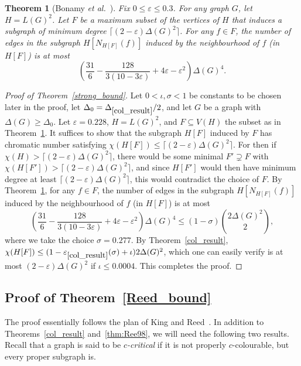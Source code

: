 \documentclass[11pt]{article}
\theoremstyle{plain}
\newtheorem{theorem}{Theorem}[section]
\newcommand{\eps}{\varepsilon}
\begin{document}
\begin{theorem}[Bonamy {\em et al.}~\cite{BPP18+}]\label{thm:BPP18+}
Fix $0\le \eps\le 0.3$. For any graph $G$, let $H=L(G)^2$.
Let $F$ be a maximum subset of the vertices of $H$ that induces a subgraph of minimum degree $\lceil(2-\eps)\Delta(G)^2\rceil$. For any $f\in F$, the number of edges in the subgraph $H[N_{H[F]}(f)]$ induced by the neighbourhood of $f$ (in $H[F]$) is at most
\[
\left(\frac{31}{6}-\frac{128}{3(10-3\eps)}+4\eps-\eps^2\right)\Delta(G)^4.
\]
\end{theorem}

\begin{proof}[Proof of Theorem~\ref{strong_bound}]
Let $0<\iota,\sigma<1$ be constants to be chosen later in the proof, let $\Delta_0=\Delta_{\ref{col_result}}/2$, and let $G$ be a graph with $\Delta(G)\ge \Delta_0$.
Let $\eps=0.228$, $H=L(G)^2$, and $F\subseteq V(H)$ the subset as in Theorem~\ref{thm:BPP18+}.
It suffices to show that the subgraph $H[F]$ induced by $F$ has chromatic number satisfying $\chi(H[F])\le \lceil(2-\eps)\Delta(G)^2\rceil$. For then if $\chi(H) > \lceil(2-\eps)\Delta(G)^2\rceil$, there would be some minimal $F' \supsetneq F$ with $\chi(H[F'])> \lceil(2-\eps)\Delta(G)^2\rceil$, and since $H[F']$ would then have minimum degree at least $\lceil(2-\eps)\Delta(G)^2\rceil$, this would contradict the choice of $F$.
By Theorem~\ref{thm:BPP18+}, for any $f\in F$, the number of edges in the subgraph $H[N_{H[F]}(f)]$ induced by the neighbourhood of $f$ (in $H[F]$) is at most
\[
\left(\frac{31}{6}-\frac{128}{3(10-3\eps)}+4\eps-\eps^2\right)\Delta(G)^4
\le (1-\sigma)\binom{2\Delta(G)^2}{2},
\]
where we take the choice $\sigma=0.277$.
By Theorem~\ref{col_result}, $\chi(H[F])\le (1-\eps_{\ref{col_result}}(\sigma)+\iota)2\Delta(G)^2$, which one can easily verify is at most $(2-\eps)\Delta(G)^2$ if $\iota\le 0.0004$. This completes the proof.
\end{proof}

\subsection{Proof of Theorem~\ref{Reed_bound}}\label{sub:Reedproof}

The proof essentially follows the plan of King and Reed~\cite{KiRe16}.
In addition to Theorems~\ref{col_result} and~\ref{thm:Ree98}, we will need the following two results. Recall that a graph is said to be {\em $c$-critical} if it is not properly $c$-colourable, but every proper subgraph is.
\end{document}
